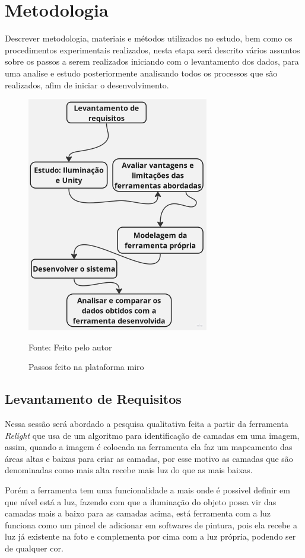 \chapter{Metodologia}
\label{cap:03}

Descrever metodologia, materiais e métodos utilizados no estudo, bem como os procedimentos experimentais realizados, nesta etapa será descrito vários assuntos sobre os passos a serem realizados iniciando com o levantamento dos dados, para uma analise e estudo posteriormente analisando todos os processos que são realizados, afim de iniciar o desenvolvimento.


\begin{figure}[ht]
\caption{Passos feito na plataforma miro}
\centering
\includegraphics{imagens/Diagrama.jpg}

Fonte: Feito pelo autor
\label{fig:diagrama}
\end{figure}

\section{Levantamento de Requisitos}

Nessa sessão será abordado a pesquisa qualitativa feita a partir da ferramenta \textit{Relight} que usa de um algoritmo para identificação de camadas em uma imagem, assim, quando a imagem é colocada na ferramenta ela faz um mapeamento das áreas altas e baixas para criar as camadas, por esse motivo as camadas que são denominadas como mais alta recebe mais luz do que as mais baixas.

Porém a ferramenta tem uma funcionalidade a mais onde é possivel definir em que nível está a luz, fazendo com que a iluminação do objeto possa vir das camadas mais a baixo para as camadas acima, está ferramenta com a luz funciona como um pincel de adicionar em softwares de pintura, pois ela recebe a luz já existente na foto e complementa por cima com a luz própria, podendo ser de qualquer cor.

